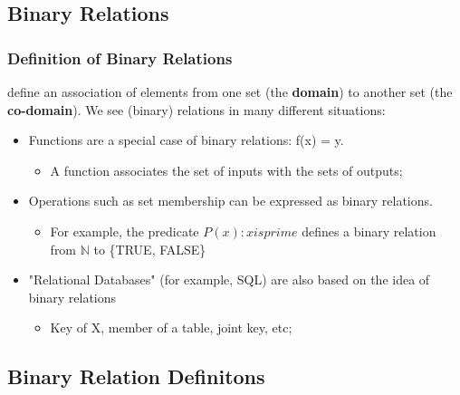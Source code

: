 \subsection{Binary Relations}
\begin{frame}
  \frametitle{Definition of Binary Relations}
   define an association of elements from one set (the {\bf domain}) to another set (the {\bf co-domain}). We see (binary) relations in many different situations:\bigskip

  \begin{itemize}
    \item Functions are a special case of binary relations: f(x) = y.
    \begin{itemize}
      \item A function associates the set of inputs with the sets of outputs;
    \end{itemize}\bigskip

    \item Operations such as set membership can be expressed as binary relations.
    \begin{itemize}
      \item For example, the predicate $P(x): x is prime$ defines a binary relation from $\mathbb{N}$ to \{TRUE, FALSE\}
    \end{itemize}\bigskip

    \item "Relational Databases" (for example, SQL) are also based on the idea of binary relations
    \begin{itemize}
      \item Key of X, member of a table, joint key, etc;
    \end{itemize}
    \end{itemize}
\end{frame}

\subsection{Binary Relation Definitons}

